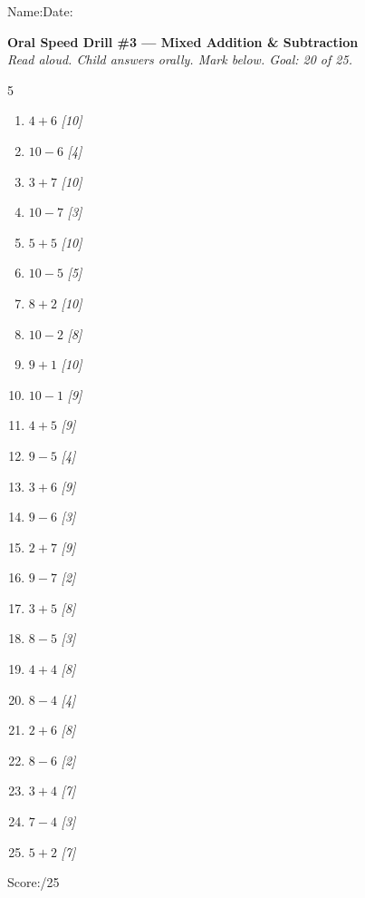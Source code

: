 \documentclass[12pt, letterpaper]{article}
\begin{document}

{\small Name:\ansblanklg \hfill Date:\ansblank}
\goldrule

\begin{mdframed}[backgroundcolor=sd-gold!15,linecolor=sd-gold,linewidth=1.5pt,roundcorner=4pt,
  innerleftmargin=10pt,innerrightmargin=10pt,innertopmargin=8pt,innerbottommargin=8pt]
\textbf{\color{sd-gold}Oral Speed Drill \#3 — Mixed Addition \& Subtraction}\\[4pt]
\textit{Read aloud. Child answers orally. Mark below. Goal: 20 of 25.}\\[6pt]
\begin{multicols}{5}
\begin{enumerate}[leftmargin=*,label=\small\arabic*.,itemsep=1pt]
  \item $4+6$ \textit{[10]}
  \item $10-6$ \textit{[4]}
  \item $3+7$ \textit{[10]}
  \item $10-7$ \textit{[3]}
  \item $5+5$ \textit{[10]}
  \item $10-5$ \textit{[5]}
  \item $8+2$ \textit{[10]}
  \item $10-2$ \textit{[8]}
  \item $9+1$ \textit{[10]}
  \item $10-1$ \textit{[9]}
  \item $4+5$ \textit{[9]}
  \item $9-5$ \textit{[4]}
  \item $3+6$ \textit{[9]}
  \item $9-6$ \textit{[3]}
  \item $2+7$ \textit{[9]}
  \item $9-7$ \textit{[2]}
  \item $3+5$ \textit{[8]}
  \item $8-5$ \textit{[3]}
  \item $4+4$ \textit{[8]}
  \item $8-4$ \textit{[4]}
  \item $2+6$ \textit{[8]}
  \item $8-6$ \textit{[2]}
  \item $3+4$ \textit{[7]}
  \item $7-4$ \textit{[3]}
  \item $5+2$ \textit{[7]}
\end{enumerate}
\end{multicols}
\noindent Score:\underline{\hspace{1.5cm}}/25
\end{mdframed}
\end{document}
